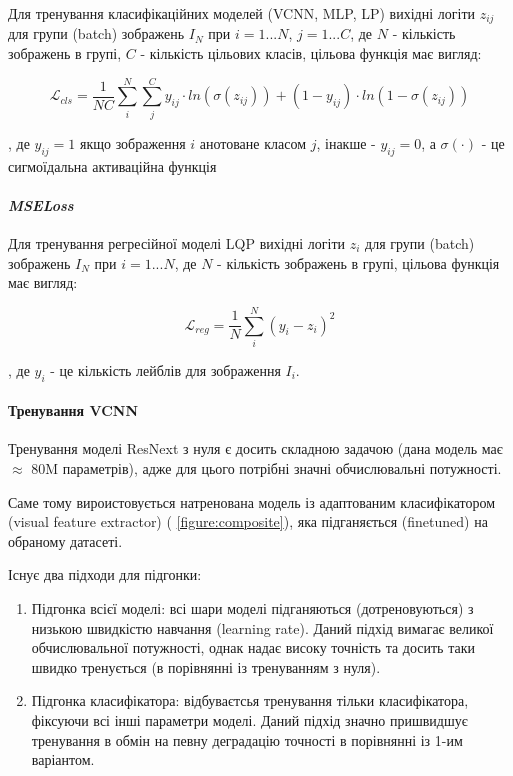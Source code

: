 \documentclass{udstu}
\begin{document}
Для тренування класифікаційних моделей (VCNN, MLP, LP) вихідні логіти $z_{ij}$
для групи (batch) зображень $I_N$ при $i = 1...N$, $j = 1...C$,
де $N$ - кількість зображень в групі, $C$ - кількість цільових класів,
цільова функція має вигляд:

\begin{equation}
\mathcal{L}_{cls} = \frac{1}{NC} \sum_{i}^{N} \sum_{j}^{C}
y_{ij} \cdot ln(\sigma(z_{ij})) + (1 - y_{ij}) \cdot ln(1 - \sigma(z_{ij}))
\end{equation}

, де $y_{ij} = 1$ якщо зображення $i$ анотоване класом $j$, інакше - $y_{ij} = 0$,
а $\sigma(\cdot)$ - це сигмоїдальна активаційна функція

\paragraph{\textit{MSELoss}\\}

Для тренування регресійної моделі LQP вихідні логіти $z_i$
для групи (batch) зображень $I_N$ при $i = 1...N$,
де $N$ - кількість зображень в групі,
цільова функція має вигляд:

\begin{equation}
\mathcal{L}_{reg} = \frac{1}{N} \sum_{i}^{N}
(y_i - z_i)^2
\end{equation}

, де $y_i$ - це кількість лейблів для зображення $I_i$.


\paragraph{\textbf{Тренування VCNN}\\}

Тренування моделі ResNext \cite{resnext} з нуля є досить складною задачою (дана модель має $\approx$ 80M параметрів),
адже для цього потрібні значні обчислювальні потужності.

Саме тому вироистовується натренована модель із адаптованим класифікатором (visual feature extractor) (\figurename{ \ref{figure:composite}}), яка підганяється (finetuned) на обраному датасеті.

Існує два підходи для підгонки:

\begin{enumerate}[1)]
	\item Підгонка всієї моделі:
	всі шари моделі підганяються (дотреновуються) з низькою швидкістю навчання (learning rate).
	Даний підхід вимагає великої обчислювальної потужності, однак надає високу точність та
	досить таки швидко тренується (в порівнянні із тренуванням з нуля).

	\item Підгонка класифікатора:
	відбуваєтсья тренування тільки класифікатора, фіксуючи всі інші параметри моделі.
	Даний підхід значно пришвидшує тренування в обмін на певну деградацію точності в порівнянні із 1-им варіантом.
\end{enumerate}
\end{document}
